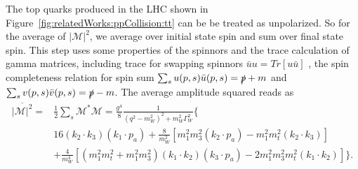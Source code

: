 \noindent The top quarks produced in the LHC shown in Figure~\ref{fig:relatedWorks:ppCollision:tt} can be be treated as unpolarized. So for the average of $|\mathcal{M}|^2$, we average over initial state spin and sum over final state spin. This step uses some properties of the spinnors and the trace calculation of gamma matrices, including trace for swapping spinnors $\bar{u} u = Tr[ u \bar{u}] $ , the spin completeness relation for spin sum $\sum_s u(p,s) \bar{u}(p,s) = \slashed{p} + m $  and $\sum_s v(p,s) \bar{v}(p,s) = \slashed{p} - m$. The average amplitude squared reads as
\begin{equation}
\begin{split}
	\overline{ |\mathcal{M}|^2 } = & \frac{1}{2} \sum_s \mathcal{M}^* \mathcal{M} =
	\frac{g^4}{8} \frac{1}{ (q^2-m^2_{W})^2 +  m^2_W \Gamma^2_W } \bigg \{  \\
	& 16  (  k_2 \cdot k_3) (  k_1 \cdot p_a) + \frac{8}{m^2_W} [ m_1^2 m_3^2 (k_2 \cdot p_a) - m_1^2 m_t^2 (k_2 \cdot k_3)] \\
	&  + \frac{4}{m^4_W} [ (m_1^2 m_t^2 + m_1^2 m_3^2) (k_1 \cdot k_2) (k_3 \cdot p_a) - 2  m_1^2 m_3^2 m_t^2  (k_1 \cdot k_2) ]\bigg\} .
\end{split}
\end{equation}

